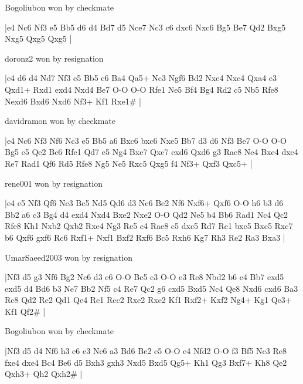 \showboard

Bogoliubon won by checkmate

\makegametitle
|e4 Nc6 Nf3 e5 Bb5 d6 d4 Bd7 d5 Nce7 Nc3 c6 dxc6 Nxc6 Bg5 Be7 Qd2 Bxg5 Nxg5 Qxg5 Qxg5  |

\showboard

doronz2 won by resignation

\makegametitle
|e4 d6 d4 Nd7 Nf3 e5 Bb5 c6 Ba4 Qa5+ Nc3 Ngf6 Bd2 Nxe4 Nxe4 Qxa4 c3 Qxd1+ Rxd1 exd4 Nxd4 Be7 O-O O-O Rfe1 Ne5 Bf4 Bg4 Rd2 c5 Nb5 Rfe8 Nexd6 Bxd6 Nxd6 Nf3+ Kf1 Rxe1\#  |

\showboard

davidramon won by checkmate

\makegametitle
|e4 Nc6 Nf3 Nf6 Nc3 e5 Bb5 a6 Bxc6 bxc6 Nxe5 Bb7 d3 d6 Nf3 Be7 O-O O-O Bg5 c5 Qe2 Bc6 Rfe1 Qd7 e5 Ng4 Bxe7 Qxe7 exd6 Qxd6 g3 Rae8 Ne4 Bxe4 dxe4 Re7 Rad1 Qf6 Rd5 Rfe8 Ng5 Ne5 Rxc5 Qxg5 f4 Nf3+ Qxf3 Qxc5+  |

\showboard

rene001 won by resignation

\makegametitle
|e4 e5 Nf3 Qf6 Nc3 Bc5 Nd5 Qd6 d3 Nc6 Be2 Nf6 Nxf6+ Qxf6 O-O h6 b3 d6 Bb2 a6 c3 Bg4 d4 exd4 Nxd4 Bxe2 Nxe2 O-O Qd2 Ne5 b4 Bb6 Rad1 Nc4 Qc2 Rfe8 Kh1 Nxb2 Qxb2 Rxe4 Ng3 Re5 c4 Rae8 c5 dxc5 Rd7 Re1 bxc5 Bxc5 Rxc7 b6 Qxf6 gxf6 Rc6 Rxf1+ Nxf1 Bxf2 Rxf6 Bc5 Rxh6 Kg7 Rh3 Re2 Ra3 Bxa3  |

\showboard

UmarSaeed2003 won by resignation

\makegametitle
|Nf3 d5 g3 Nf6 Bg2 Nc6 d3 e6 O-O Bc5 c3 O-O e3 Re8 Nbd2 b6 e4 Bb7 exd5 exd5 d4 Bd6 b3 Ne7 Bb2 Nf5 c4 Re7 Qc2 g6 cxd5 Bxd5 Nc4 Qe8 Nxd6 cxd6 Ba3 Rc8 Qd2 Re2 Qd1 Qe4 Re1 Rcc2 Rxe2 Rxe2 Kf1 Rxf2+ Kxf2 Ng4+ Kg1 Qe3+ Kf1 Qf2\#  |

\showboard

Bogoliubon won by checkmate

\makegametitle
|Nf3 d5 d4 Nf6 h3 e6 e3 Nc6 a3 Bd6 Be2 e5 O-O e4 Nfd2 O-O f3 Bf5 Nc3 Re8 fxe4 dxe4 Bc4 Be6 d5 Bxh3 gxh3 Nxd5 Bxd5 Qg5+ Kh1 Qg3 Bxf7+ Kh8 Qe2 Qxh3+ Qh2 Qxh2\#  |

